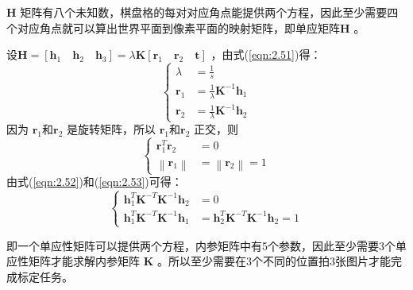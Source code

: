 $\bm{H} $ 矩阵有八个未知数，棋盘格的每对对应角点能提供两个方程，因此至少需要四个对应角点就可以算出世界平面到像素平面的映射矩阵，即单应矩阵$\bm{H} $ 。

设$\bm{H}=[ \bm{h}_1 \quad \bm{h}_2 \quad  \bm{h}_3 ]=\lambda \bm{K}[ \bm{r}_1 \quad \bm{r}_2 \quad  \bm{t} ] $ ，由式(\ref{eqn:2.51})得：
\begin{equation}
\label{eqn:2.52}
\left\{
\begin{aligned}
\lambda &= \frac{1}{s} \\ 
\bm{r}_{1} &= \frac{1}{\lambda} \bm{K}^{-1} \bm{h}_{1} \\ 
\bm{r}_{2} &= \frac{1}{\lambda} \bm{K}^{-1} \bm{h}_{2}
\end{aligned}
\right.
\end{equation}
因为 $\bm{r}_1 $和$\bm{r}_2 $ 是旋转矩阵，所以  $\bm{r}_1 $和$\bm{r}_2 $ 正交，则
\begin{equation}
\label{eqn:2.53}
\left\{
\begin{aligned}
\bm{r}_{1}^{T} \bm{r}_{2}&=0 \\ 
\left\|\bm{r}_{1}\right\|&=\left\|\bm{r}_{2}\right\|=1
\end{aligned}
\right.
\end{equation}
由式(\ref{eqn:2.52})和(\ref{eqn:2.53})可得：
\begin{equation}
\label{eqn:2.54}
\left\{
\begin{aligned} 
\bm{h}_{1}^{T} \bm{K}^{-T} \bm{K}^{-1} \bm{h}_{2} &=0 \\ 
\bm{h}_{1}^{T} \bm{K}^{-T} \bm{K}^{-1} \bm{h}_{1} &=\bm{h}_{2}^{T} \bm{K}^{-T} \bm{K}^{-1} \bm{h}_{2}=1
\end{aligned}
\right.
\end{equation}

即一个单应性矩阵可以提供两个方程，内参矩阵中有5个参数，因此至少需要3个单应性矩阵才能求解内参矩阵 $\bm{K} $ 。所以至少需要在3个不同的位置拍3张图片才能完成标定任务。

